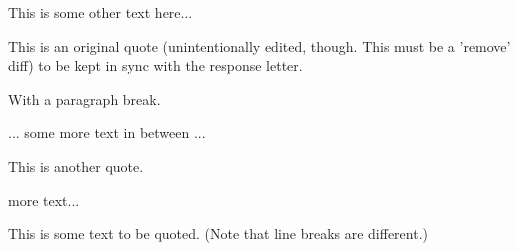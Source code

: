 
This is some other text here...


This is an original quote (unintentionally edited, though. This must be a
'remove' diff) to be kept in sync with the response letter.

With a paragraph break.


... some more text in between ...

This is another quote.


more text...

This is some text to be quoted. (Note that line breaks are different.)
